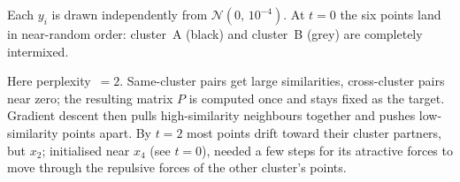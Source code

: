Each $y_i$ is drawn independently from $\mathcal{N}(0,\,10^{-4})$.
At $t{=}0$ the six points land in near-random order: cluster~A (black) and 
cluster~B (grey) are completely intermixed.

\begin{center}
\end{center}

\vspace{0.5em}
Here perplexity~$= 2$.
Same-cluster pairs get large similarities, cross-cluster pairs near zero; 
the resulting matrix $P$ is computed once and stays fixed as the target.
Gradient descent then pulls high-similarity neighbours together and pushes 
low-similarity points apart.
By $t{=}2$ most points drift toward their cluster partners, but $x_2$; initialised 
near $x_4$ (see $t{=}0$), needed a few steps for its atractive forces to move through 
the repulsive forces of the other cluster's points.


